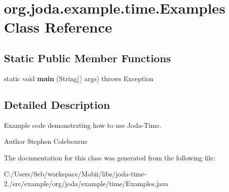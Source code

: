 \hypertarget{classorg_1_1joda_1_1example_1_1time_1_1_examples}{\section{org.\-joda.\-example.\-time.\-Examples Class Reference}
\label{classorg_1_1joda_1_1example_1_1time_1_1_examples}
}
\subsection*{Static Public Member Functions}
\begin{DoxyCompactItemize}
\item 
\hypertarget{classorg_1_1joda_1_1example_1_1time_1_1_examples_a107ee423afff49a9492e4daf6099a87f}{static void {\bfseries main} (String\mbox{[}$\,$\mbox{]} args)  throws Exception }\label{classorg_1_1joda_1_1example_1_1time_1_1_examples_a107ee423afff49a9492e4daf6099a87f}

\end{DoxyCompactItemize}


\subsection{Detailed Description}
Example code demonstrating how to use Joda-\/\-Time.

\begin{DoxyAuthor}{Author}
Stephen Colebourne 
\end{DoxyAuthor}


The documentation for this class was generated from the following file\-:\begin{DoxyCompactItemize}
\item 
C\-:/\-Users/\-Seb/workspace/\-Mobii/libs/joda-\/time-\/2./src/example/org/joda/example/time/Examples.\-java\end{DoxyCompactItemize}
